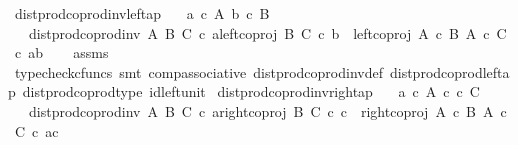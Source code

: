 \begin{isabellebody}
%
\isadelimproof
\isanewline
%
\endisadelimproof
\isanewline
{}\isamarkupfalse%
\ dist{\isacharunderscore}{\kern0pt}prod{\isacharunderscore}{\kern0pt}coprod{\isacharunderscore}{\kern0pt}inv{\isacharunderscore}{\kern0pt}left{\isacharunderscore}{\kern0pt}ap{\isacharcolon}{\kern0pt}\isanewline
\ \ \ {\isachardoublequoteopen}a\ {\isasymin}\isactrlsub c\ A{\isachardoublequoteclose}\ {\isachardoublequoteopen}b\ {\isasymin}\isactrlsub c\ B{\isachardoublequoteclose}\isanewline
\ \ \ {\isachardoublequoteopen}dist{\isacharunderscore}{\kern0pt}prod{\isacharunderscore}{\kern0pt}coprod{\isacharunderscore}{\kern0pt}inv\ A\ B\ C\ {\isasymcirc}\isactrlsub c\ {\isasymlangle}a{\isacharcomma}{\kern0pt}left{\isacharunderscore}{\kern0pt}coproj\ B\ C\ {\isasymcirc}\isactrlsub c\ b{\isasymrangle}\ {\isacharequal}{\kern0pt}\ left{\isacharunderscore}{\kern0pt}coproj\ {\isacharparenleft}{\kern0pt}A\ {\isasymtimes}\isactrlsub c\ B{\isacharparenright}{\kern0pt}\ {\isacharparenleft}{\kern0pt}A\ {\isasymtimes}\isactrlsub c\ C{\isacharparenright}{\kern0pt}\ {\isasymcirc}\isactrlsub c\ {\isasymlangle}a{\isacharcomma}{\kern0pt}b{\isasymrangle}{\isachardoublequoteclose}\isanewline
%
\isadelimproof
\ \ %
\endisadelimproof
%
\isatagproof
{}\isamarkupfalse%
\ assms\ \isamarkupfalse%
\ {\isacharparenleft}{\kern0pt}typecheck{\isacharunderscore}{\kern0pt}cfuncs{\isacharcomma}{\kern0pt}\ smt\ comp{\isacharunderscore}{\kern0pt}associative{}\ dist{\isacharunderscore}{\kern0pt}prod{\isacharunderscore}{\kern0pt}coprod{\isacharunderscore}{\kern0pt}inv{\isacharunderscore}{\kern0pt}def{}\ dist{\isacharunderscore}{\kern0pt}prod{\isacharunderscore}{\kern0pt}coprod{\isacharunderscore}{\kern0pt}left{\isacharunderscore}{\kern0pt}ap\ dist{\isacharunderscore}{\kern0pt}prod{\isacharunderscore}{\kern0pt}coprod{\isacharunderscore}{\kern0pt}type\ id{\isacharunderscore}{\kern0pt}left{\isacharunderscore}{\kern0pt}unit{}{\isacharparenright}{\kern0pt}%
\endisatagproof
{\isafoldproof}%
%
\isadelimproof
\isanewline
%
\endisadelimproof
\isanewline
{}\isamarkupfalse%
\ dist{\isacharunderscore}{\kern0pt}prod{\isacharunderscore}{\kern0pt}coprod{\isacharunderscore}{\kern0pt}inv{\isacharunderscore}{\kern0pt}right{\isacharunderscore}{\kern0pt}ap{\isacharcolon}{\kern0pt}\isanewline
\ \ \ {\isachardoublequoteopen}a\ {\isasymin}\isactrlsub c\ A{\isachardoublequoteclose}\ {\isachardoublequoteopen}c\ {\isasymin}\isactrlsub c\ C{\isachardoublequoteclose}\isanewline
\ \ \ {\isachardoublequoteopen}dist{\isacharunderscore}{\kern0pt}prod{\isacharunderscore}{\kern0pt}coprod{\isacharunderscore}{\kern0pt}inv\ A\ B\ C\ {\isasymcirc}\isactrlsub c\ {\isasymlangle}a{\isacharcomma}{\kern0pt}right{\isacharunderscore}{\kern0pt}coproj\ B\ C\ {\isasymcirc}\isactrlsub c\ c{\isasymrangle}\ {\isacharequal}{\kern0pt}\ right{\isacharunderscore}{\kern0pt}coproj\ {\isacharparenleft}{\kern0pt}A\ {\isasymtimes}\isactrlsub c\ B{\isacharparenright}{\kern0pt}\ {\isacharparenleft}{\kern0pt}A\ {\isasymtimes}\isactrlsub c\ C{\isacharparenright}{\kern0pt}\ {\isasymcirc}\isactrlsub c\ {\isasymlangle}a{\isacharcomma}{\kern0pt}c{\isasymrangle}{\isachardoublequoteclose}\isanewline

\end{isabellebody}
